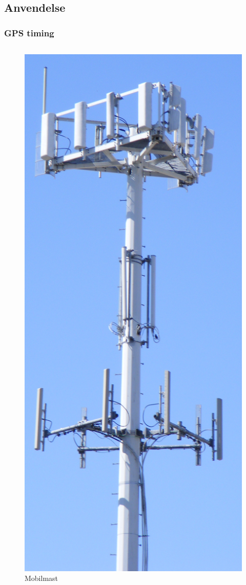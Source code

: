 \documentclass[xcolor=table]{beamer}
\begin{document}
\subsection{Anvendelse}
\begin{frame}
\frametitle{GPS timing}
  \begin{columns}
          \hspace{-50pt}
      \begin{figure}
        \includegraphics[scale=0.045]{thesis/graphics/Cell-Tower.jpg}
        \caption{Mobilmast \cite{CELLTOWER}}
      \end{figure}


\end{columns}
\end{frame}
\end{document}
